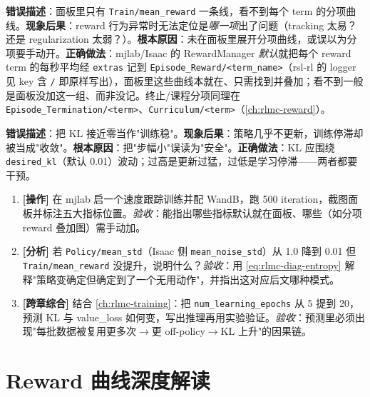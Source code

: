 \begin{pitfall}
\textbf{错误描述}：面板里只有 \verb|Train/mean_reward| 一条线，看不到每个 term 的分项曲线。\textbf{现象后果}：reward 行为异常时无法定位是\emph{哪一项}出了问题（tracking 太易？还是 regularization 太弱？）。\textbf{根本原因}：未在面板里展开分项曲线，或误以为分项要手动开。\textbf{正确做法}：mjlab/Isaac 的 RewardManager \emph{默认}就把每个 reward term 的每秒平均经 \verb|extras| 记到 \verb|Episode_Reward/<term_name>|（rsl-rl 的 logger 见 key 含 \texttt{/} 即原样写出），面板里这些曲线本就在、只需找到并叠加；看不到一般是面板没加这一组、而非没记。终止/课程分项同理在 \verb|Episode_Termination/<term>|、\verb|Curriculum/<term>|（\cref{ch:rlmc-reward}）。
\end{pitfall}

\begin{pitfall}
\textbf{错误描述}：把 KL 接近零当作"训练稳"。\textbf{现象后果}：策略几乎不更新，训练停滞却被当成"收敛"。\textbf{根本原因}：把"步幅小"误读为"安全"。\textbf{正确做法}：KL 应围绕 \verb|desired_kl|（默认 0.01）波动；过高是更新过猛，过低是学习停滞——两者都要干预。
\end{pitfall}

\begin{practice}[本节动手任务]
\begin{enumerate}
  \item \textbf{[操作]} 在 mjlab 启一个速度跟踪训练并配 WandB，跑 500 iteration，截图面板并标注五大指标位置。\emph{验收}：能指出哪些指标默认就在面板、哪些（如分项 reward 叠加图）需手动加。
  \item \textbf{[分析]} 若 \verb|Policy/mean_std|（Isaac 侧 \verb|mean_noise_std|）从 1.0 降到 0.01 但 \verb|Train/mean_reward| 没提升，说明什么？\emph{验收}：用 \eqref{eq:rlmc-diag-entropy} 解释"策略变确定但确定到了一个无用动作"，并指出这对应后文哪种模式。
  \item \textbf{[跨章综合]} 结合 \cref{ch:rlmc-training}：把 \verb|num_learning_epochs| 从 5 提到 20，预测 KL 与 value\_loss 如何变，写出推理再用实验验证。\emph{验收}：预测里必须出现"每批数据被复用更多次$\to$更 off-policy$\to$KL 上升"的因果链。
\end{enumerate}
\end{practice}

\section{Reward 曲线深度解读}
\label{sec:rlmc-diag-reward}

